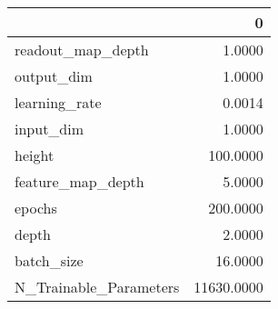 \begin{tabular}{lr}
\toprule
{} &           0 \\
\midrule
readout\_map\_depth      &      1.0000 \\
output\_dim             &      1.0000 \\
learning\_rate          &      0.0014 \\
input\_dim              &      1.0000 \\
height                 &    100.0000 \\
feature\_map\_depth      &      5.0000 \\
epochs                 &    200.0000 \\
depth                  &      2.0000 \\
batch\_size             &     16.0000 \\
N\_Trainable\_Parameters &  11630.0000 \\
\bottomrule
\end{tabular}
